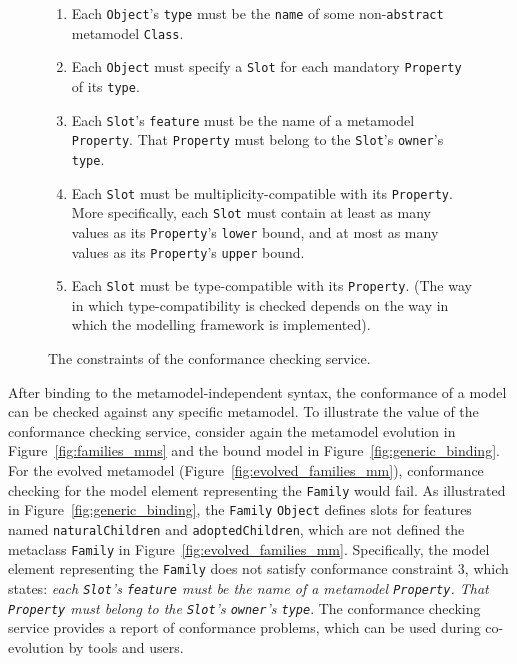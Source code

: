 \begin{figure}[p]
	\begin{framed}
	  \begin{enumerate}
			\item Each \texttt{Ob\-je\-ct}'s \texttt{ty\-pe} must be the \texttt{na\-me} of some non-\texttt{ab\-str\-act} metamodel \texttt{Cl\-a\-ss}.
			\item Each \texttt{Ob\-je\-ct} must specify a \texttt{Sl\-ot} for each mandatory \texttt{Pr\-op\-er\-ty} of its \texttt{ty\-pe}.
			\item Each \texttt{Sl\-ot}'s \texttt{fe\-at\-u\-re} must be the name of a metamodel \texttt{Pr\-op\-er\-ty}. That \texttt{Pr\-op\-er\-ty} must belong to the \texttt{Sl\-ot}'s \texttt{ow\-n\-er}'s \texttt{ty\-pe}.
			\item Each \texttt{Sl\-ot} must be multiplicity-compatible with its \texttt{Pr\-op\-er\-ty}. More specifically, each \texttt{Sl\-ot} must contain at least as many values as its \texttt{Pr\-op\-er\-ty}'s \texttt{lo\-w\-er} bound, and at most as many values as its \texttt{Pr\-op\-er\-ty}'s \texttt{up\-p\-er} bound.
		  \item Each \texttt{Sl\-ot} must be type-compatible with its \texttt{Pr\-op\-er\-ty}. (The way in which type-compatibility is checked depends on the way in which the modelling framework is implemented).
		\end{enumerate}
	\end{framed}
  \caption{The constraints of the conformance checking service.}
  \label{fig:conformance_checking_constraints}
\end{figure}

After binding to the metamodel-independent syntax, the conformance of a model can be checked against any specific metamodel. To illustrate the value of the conformance checking service, consider again the metamodel evolution in Figure~\ref{fig:families_mms} and the bound model in Figure~\ref{fig:generic_binding}. For the evolved metamodel (Figure~\ref{fig:evolved_families_mm}), conformance checking for the model element representing the \texttt{Fa\-mi\-ly} would fail. As illustrated in Figure~\ref{fig:generic_binding}, the \texttt{Fa\-mi\-ly} \texttt{Ob\-je\-ct} defines slots for features named  \texttt{na\-tu\-r\-alCh\-il\-dr\-en} and \texttt{ad\-op\-t\-edCh\-il\-dr\-en}, which are not defined the metaclass \texttt{Fa\-mi\-ly} in Figure~\ref{fig:evolved_families_mm}. Specifically, the model element representing the \texttt{Fa\-mi\-ly} does not satisfy conformance constraint 3, which states: \emph{each \texttt{Sl\-ot}'s \texttt{fe\-at\-u\-re} must be the name of a metamodel \texttt{Pr\-op\-er\-ty}. That \texttt{Pr\-op\-er\-ty} must belong to the \texttt{Sl\-ot}'s \texttt{ow\-n\-er}'s \texttt{ty\-pe}}. The conformance checking service provides a report of conformance problems, which can be used during co-evolution by tools and users.

